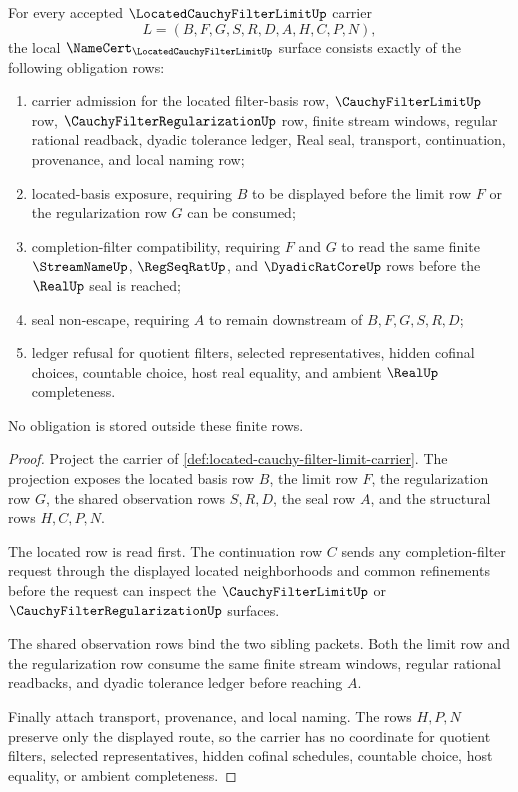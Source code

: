 \begin{theorem}
\label{thm:located-cauchy-filter-limit-namecert-obligations}
For every accepted $\LocatedCauchyFilterLimitUp$ carrier
$$
L=(B,F,G,S,R,D,A,H,C,P,N),
$$
the local $\NameCert_{\LocatedCauchyFilterLimitUp}$ surface consists exactly of the following obligation rows:
\begin{enumerate}
\item carrier admission for the located filter-basis row, $\CauchyFilterLimitUp$ row, $\CauchyFilterRegularizationUp$ row, finite stream windows, regular rational readback, dyadic tolerance ledger, Real seal, transport, continuation, provenance, and local naming row;
\item located-basis exposure, requiring $B$ to be displayed before the limit row $F$ or the regularization row $G$ can be consumed;
\item completion-filter compatibility, requiring $F$ and $G$ to read the same finite $\StreamNameUp$, $\RegSeqRatUp$, and $\DyadicRatCoreUp$ rows before the $\RealUp$ seal is reached;
\item seal non-escape, requiring $A$ to remain downstream of $B,F,G,S,R,D$;
\item ledger refusal for quotient filters, selected representatives, hidden cofinal choices, countable choice, host real equality, and ambient $\RealUp$ completeness.
\end{enumerate}
No obligation is stored outside these finite rows.
\end{theorem}
\begin{proof}
Project the carrier of \autoref{def:located-cauchy-filter-limit-carrier}. The projection exposes the located basis row $B$, the limit row $F$, the regularization row $G$, the shared observation rows $S,R,D$, the seal row $A$, and the structural rows $H,C,P,N$.

The located row is read first. The continuation row $C$ sends any completion-filter request through the displayed located neighborhoods and common refinements before the request can inspect the $\CauchyFilterLimitUp$ or $\CauchyFilterRegularizationUp$ surfaces.

The shared observation rows bind the two sibling packets. Both the limit row and the regularization row consume the same finite stream windows, regular rational readbacks, and dyadic tolerance ledger before reaching $A$.

Finally attach transport, provenance, and local naming. The rows $H,P,N$ preserve only the displayed route, so the carrier has no coordinate for quotient filters, selected representatives, hidden cofinal schedules, countable choice, host equality, or ambient completeness.
\end{proof}

